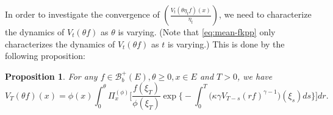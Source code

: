 \documentclass[12pt, a4paper]{amsart}
\newtheorem{prop}[thm]{Proposition}
\theoremstyle{definition}
\numberwithin{equation}{section}
\begin{document}
	In order to investigate the convergence of $(\frac{ V_t(\theta \eta_t f)(x)}{\eta_t})$, we need to characterize the dynamics of $V_t(\theta f)$ as $\theta$ is varying.
	(Note that \eqref{eq:mean-fkpp} only characterizes the dynamics of $V_t(\theta f)$ as $t$ is varying.)
	This is done by the following proposition:

\begin{prop}
	For any $f\in \mathscr B^+_b(E),\theta \geq 0,x\in E$ and $T>0$, we have
\[\label{eq: equation for Vt(theta f) for theta}
	V_T ( \theta f) ( x)
	= \phi( x) \int_0^\theta \Pi_x^{(\phi)} \Big[ \frac{ f(\xi_T) } { \phi(\xi_T) } \exp\Big\{ - \int_0^T \big( \kappa \gamma V_{T-s} (r f)^{ \gamma - 1} \big) ( \xi_s) ds\Big\} \Big] dr.
\]
\end{prop}
\end{document}
